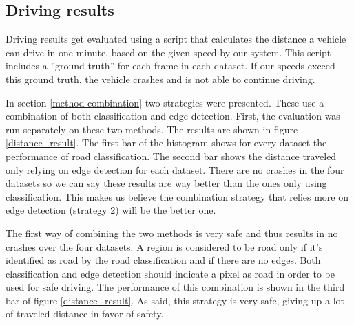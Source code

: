 \documentclass[runningheads,a4paper]{llncs}
\begin{document}
\subsection{Driving results}
Driving results get evaluated using a script that calculates the distance a vehicle can drive in one minute, based on the given speed by our system. This script includes a ''ground truth'' for each frame in each dataset. If our speeds exceed this ground truth, the vehicle crashes and is not able to continue driving.

In section \ref{method-combination} two strategies were presented. These use a combination of both classification and edge detection. First, the evaluation was run separately on these two methods. The results are shown in figure \ref{distance_result}. The first bar of the histogram shows for every dataset the performance of road classification. The second bar shows the distance traveled only relying on edge detection for each dataset. There are no crashes in the four datasets so we can say these results are way better than the ones only using classification. This makes us believe the combination strategy that relies more on edge detection (strategy 2) will be the better one.

The first way of combining the two methods is very safe and thus results in no crashes over the four datasets. A region is considered to be road only if it's identified as road by the road classification and if there are no edges. Both classification and edge detection should indicate a pixel as road in order to be used for safe driving. The performance of this combination is shown in the third bar of figure \ref{distance_result}. As said, this strategy is very safe, giving up a lot of traveled distance in favor of safety. 
\end{document}
